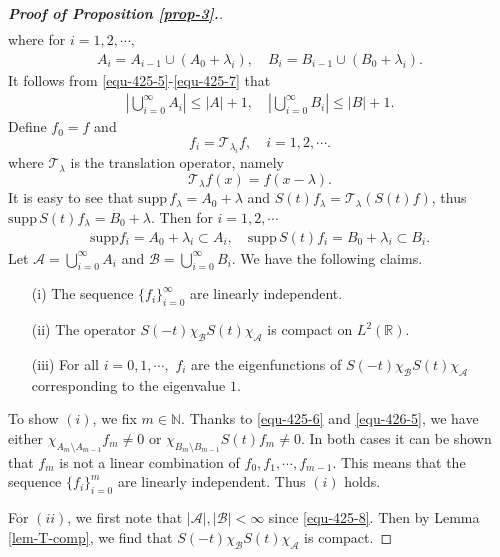 \documentclass[12pt]{amsart}
\def\R {\mathbb{R}}
\theoremstyle{definition}
\numberwithin{equation}{section}
\begin{document}
\begin{proof}[\bf \textit{Proof of Proposition \ref{prop-3}}.]
\begin{align}
\end{align}
where for $i=1,2,\cdots,$
\begin{align}\label{equ-425-7}
A_i=A_{i-1}\cup  (A_0+\lambda_i), \quad B_i=B_{i-1}\cup (B_0+\lambda_i).
\end{align}
It follows from \eqref{equ-425-5}-\eqref{equ-425-7} that
\begin{align}\label{equ-425-8}
|\bigcup_{i=0}^{\infty}A_i|\leq |A|+1,\quad |\bigcup_{i=0}^{\infty}B_i|\leq|B|+1.
\end{align}
Define $f_0=f$ and
$$
f_i=\mathcal{T}_{\lambda_i}f, \quad i=1,2,\cdots.
$$
where $\mathcal{T}_\lambda$ is the translation operator, namely
\begin{equation*}
    \mathcal{T}_{\lambda}f(x)=f(x-\lambda).
\end{equation*}
It is easy to see that   $\mathrm{supp}\, f_\lambda=A_0+\lambda$ and $S(t)f_\lambda=\mathcal{T}_{\lambda}(S(t)f)$, thus  $\mathrm{supp}\,S(t)f_\lambda= B_0+\lambda$. Then for $i=1,2,\cdots$
\begin{align}\label{equ-426-5}
\mathrm{supp }f_i=A_0+\lambda_i\subset A_i, \quad \mathrm{supp}\,S(t)f_i =B_0+\lambda_i\subset B_i.
\end{align}
Let $\mathcal {A}=\bigcup_{i=0}^{\infty}A_i$ and $\mathcal {B}=\bigcup_{i=0}^{\infty}B_i$. We have the following claims.
\begin{itemize}
  \item [(i)] The sequence $\{ f_i\}_{i=0}^{\infty}$ are linearly independent.
  \item [(ii)]  The operator $S(-t)\chi_\mathcal {B}S(t)\chi_\mathcal {A}$ is compact on $L^2(\R)$.
  \item [(iii)]  For all $i=0,1,\cdots,$ $f_i$ are the eigenfunctions of $S(-t)\chi_\mathcal {B}S(t)\chi_\mathcal {A}$ corresponding to the eigenvalue $1$.
\end{itemize}

To show $(i)$, we fix $m\in \mathbb{N}$. Thanks to \eqref{equ-425-6} and \eqref{equ-426-5}, we have either $\chi_{A_m\setminus A_{m-1}}f_m\neq 0$ or $\chi_{B_m\setminus B_{m-1}}S(t)f_m\neq 0$. In both cases it can be shown that $f_m$ is not a linear combination of $f_0,f_1,\cdots,f_{m-1}$. This means that the sequence $\{f_i\}_{i=0}^{m}$ are linearly independent. Thus $(i)$ holds.

For $(ii)$, we first note that $|\mathcal {A}|,|\mathcal {B}|<\infty$ since \eqref{equ-425-8}. Then by Lemma \ref{lem-T-comp}, we find that $S(-t)\chi_\mathcal {B}S(t)\chi_\mathcal {A}$ is compact.


\end{proof}
\end{document}
